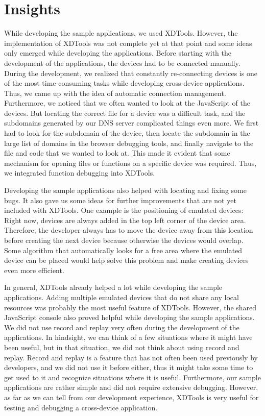 \section{Insights}

While developing the sample applications, we used XDTools. However, the implementation of XDTools was not complete yet at that point and some ideas only emerged while developing the applications. Before starting with the development of the applications, the devices had to be connected manually. During the development, we realized that constantly re-connecting devices is one of the most time-consuming tasks while developing cross-device applications. Thus, we came up with the idea of automatic connection management. Furthermore, we noticed that we often wanted to look at the JavaScript of the devices. But locating the correct file for a device was a difficult task, and the subdomains generated by our DNS server complicated things even more. We first had to look for the subdomain of the device, then locate the subdomain in the large list of domains in the browser debugging tools, and finally navigate to the file and code that we wanted to look at. This made it evident that some mechanism for opening files or functions on a specific device was required. Thus, we integrated function debugging into XDTools. 

Developing the sample applications also helped with locating and fixing some bugs. It also gave us some ideas for further improvements that are not yet included with XDTools. One example is the positioning of emulated devices: Right now, devices are always added in the top left corner of the device area. Therefore, the developer always has to move the device away from this location before creating the next device because otherwise the devices would overlap. Some algorithm that automatically looks for a free area where the emulated device can be placed would help solve this problem and make creating devices even more efficient.

In general, XDTools already helped a lot while developing the sample applications. Adding multiple emulated devices that do not share any local resources was probably the most useful feature of XDTools. However, the shared JavaScript console also proved helpful while developing the sample applications. We did not use record and replay very often during the development of the applications. In hindsight, we can think of a few situations where it might have been useful, but in that situation, we did not think about using record and replay. Record and replay is a feature that has not often been used previously by developers, and we did not use it before either, thus it might take some time to get used to it and recognize situations where it is useful. Furthermore, our sample applications are rather simple and did not require extensive debugging. However, as far as we can tell from our development experience, XDTools is very useful for testing and debugging a cross-device application.